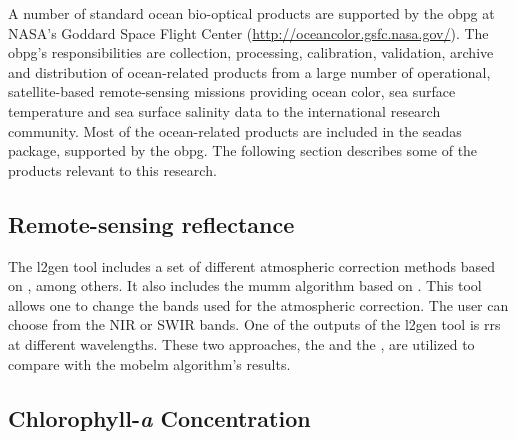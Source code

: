 A number of standard ocean bio-optical products are supported by the \gls{obpg} at NASA's Goddard Space Flight Center (\url{http://oceancolor.gsfc.nasa.gov/}). The \gls{obpg}'s responsibilities are collection, processing, calibration, validation, archive and distribution of ocean-related products from a large number of operational, satellite-based remote-sensing missions providing ocean color, sea surface temperature and sea surface salinity data to the international research community. Most of the ocean-related products are included in the \gls{seadas} package, supported by the \gls{obpg}. The following section describes some of the products relevant to this research.

\subsection{Remote-sensing reflectance}
\label{subsec:seadasrrs}
The l2gen tool includes a set of different atmospheric correction methods based on \citet{Gordon:1994}, among others. It also includes the \gls{mumm} algorithm based on \citet{Ruddick:2000bs}. This tool allows one to change the bands used for the atmospheric correction. The user can choose from the NIR or SWIR bands. One of the outputs of the l2gen tool is \gls{rrs} at different wavelengths. These two approaches, the \citet{Gordon:1994} and the \citet{Ruddick:2000bs}, are utilized to compare with the \gls{mobelm} algorithm's results.

\subsection{Chlorophyll-{\it a} Concentration}
\label{subsec:chlempirical}

